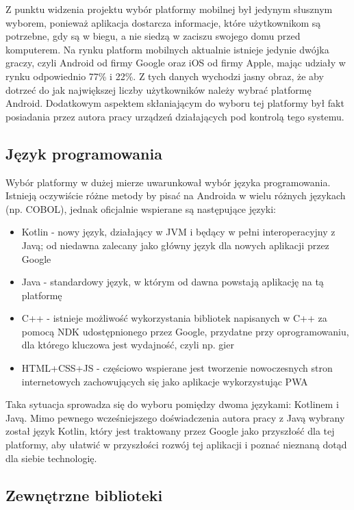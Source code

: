 \documentclass[polish,polish,a4paper,12pt]{article}
\begin{document}
	Z punktu widzenia projektu wybór platformy mobilnej był jedynym słusznym wyborem, ponieważ aplikacja dostarcza informacje, które użytkownikom są potrzebne, gdy są w biegu, a nie siedzą w zaciszu swojego domu przed komputerem. Na rynku platform mobilnych aktualnie istnieje jedynie dwójka graczy, czyli Android od firmy Google oraz iOS od firmy Apple, mając udziały w rynku odpowiednio 77\% i 22\%. Z tych danych wychodzi jasny obraz, że aby dotrzeć do jak największej liczby użytkowników należy wybrać platformę Android. Dodatkowym aspektem skłaniającym do wyboru tej platformy był fakt posiadania przez autora pracy urządzeń działających pod kontrolą tego systemu.

	\subsection{Język programowania}

	Wybór platformy w dużej mierze uwarunkował wybór języka programowania. Istnieją oczywiście różne metody by pisać na Androida w wielu różnych językach (np. COBOL), jednak oficjalnie wspierane są następujące języki:

	\begin{itemize}
		\item Kotlin - nowy język, działający w JVM i będący w pełni interoperacyjny z Javą; od niedawna zalecany jako główny język dla nowych aplikacji przez Google
		\item Java - standardowy język, w którym od dawna powstają aplikację na tą platformę
		\item C++ - istnieje możliwość wykorzystania bibliotek napisanych w C++ za pomocą NDK udostępnionego przez Google, przydatne przy oprogramowaniu, dla którego kluczowa jest wydajność, czyli np. gier
		\item HTML+CSS+JS - częściowo wspierane jest tworzenie nowoczesnych stron internetowych zachowujących się jako aplikacje wykorzystując PWA
	\end{itemize}

	Taka sytuacja sprowadza się do wyboru pomiędzy dwoma językami: Kotlinem i Javą. Mimo pewnego wcześniejszego doświadczenia autora pracy z Javą wybrany został język Kotlin, który jest traktowany przez Google jako przyszłość dla tej platformy, aby ułatwić w przyszłości rozwój tej aplikacji i poznać nieznaną dotąd dla siebie technologię.

	\subsection{Zewnętrzne biblioteki}
\end{document}
